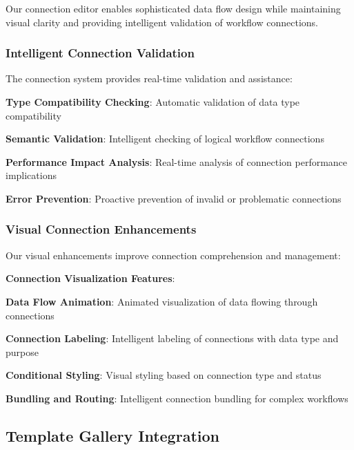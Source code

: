 Our connection editor enables sophisticated data flow design while maintaining visual clarity and providing intelligent validation of workflow connections.

\subsubsection*{Intelligent Connection Validation}

The connection system provides real-time validation and assistance:

\begin{compactlist}
    \item \textbf{Type Compatibility Checking}: Automatic validation of data type compatibility
    \item \textbf{Semantic Validation}: Intelligent checking of logical workflow connections
    \item \textbf{Performance Impact Analysis}: Real-time analysis of connection performance implications
    \item \textbf{Error Prevention}: Proactive prevention of invalid or problematic connections
\end{compactlist}

\subsubsection*{Visual Connection Enhancements}

Our visual enhancements improve connection comprehension and management:

\begin{successbox}
\textbf{Connection Visualization Features}:
\begin{compactlist}
    \item \textbf{Data Flow Animation}: Animated visualization of data flowing through connections
    \item \textbf{Connection Labeling}: Intelligent labeling of connections with data type and purpose
    \item \textbf{Conditional Styling}: Visual styling based on connection type and status
    \item \textbf{Bundling and Routing}: Intelligent connection bundling for complex workflows
\end{compactlist}
\end{successbox}

\subsection*{Template Gallery Integration}

